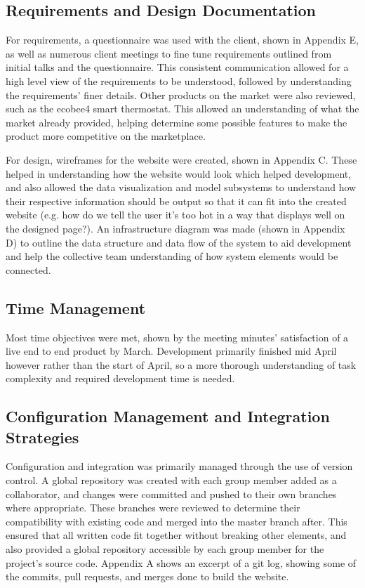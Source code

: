 \documentclass[]{report}
\begin{document}
	\subsection{Requirements and Design Documentation}
	For requirements, a questionnaire was used with the client, shown in Appendix E, as well as numerous client meetings to fine tune requirements outlined from initial talks and the questionnaire. This consistent communication allowed for a high level view of the requirements to be understood, followed by understanding the requirements' finer details. Other products on the market were also reviewed, such as the ecobee4\cite{ecobee4} smart thermostat. This allowed an understanding of what the market already provided, helping determine some possible features to make the product more competitive on the marketplace.
	\medskip
	
	For design, wireframes for the website were created, shown in Appendix C. These helped in understanding how the website would look which helped development, and also allowed the data visualization and model subsystems to understand how their respective information should be output so that it can fit into the created website (e.g. how do we tell the user it's too hot in a way that displays well on the designed page?). An infrastructure diagram was made (shown in Appendix D) to outline the data structure and data flow of the system to aid development and help the collective team understanding of how system elements would be connected.
	
	\subsection{Time Management}
	Most time objectives were met, shown by the meeting minutes' satisfaction of a live end to end product by March. Development primarily finished mid April however rather than the start of April, so a more thorough understanding of task complexity and required development time is needed.
	
	\subsection{Configuration Management and Integration Strategies}
	Configuration and integration was primarily managed through the use of version control. A global repository was created with each group member added as a collaborator, and changes were committed and pushed to their own branches where appropriate. These branches were reviewed to determine their compatibility with existing code and merged into the master branch after. This ensured that all written code fit together without breaking other elements, and also provided a global repository accessible by each group member for the project's source code. Appendix A shows an excerpt of a git log, showing some of the commits, pull requests, and merges done to build the website. 
	
\end{document}
